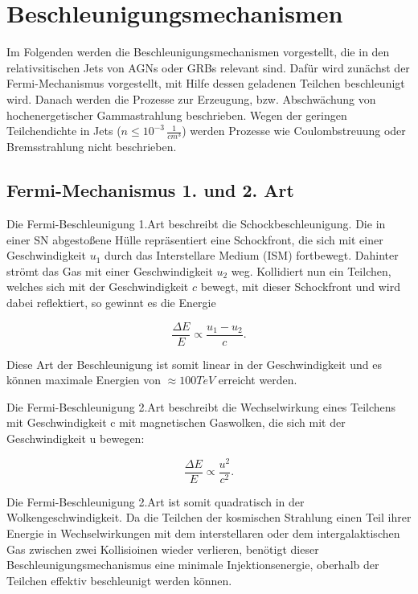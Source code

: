 \section{Beschleunigungsmechanismen} 
\label{sec:Beschleunigungsmechanismen}
Im Folgenden werden die Beschleunigungsmechanismen vorgestellt, die in den relativsitischen Jets von AGNs oder GRBs relevant sind.
Dafür wird zunächst der Fermi-Mechanismus vorgestellt, mit Hilfe dessen geladenen Teilchen beschleunigt wird.
Danach werden die Prozesse zur Erzeugung, bzw. Abschwächung von hochenergetischer Gammastrahlung beschrieben.
Wegen der geringen Teilchendichte in Jets ($n\leq 10^{-3}\,\frac{1}{cm^3}$) werden Prozesse wie Coulombstreuung oder Bremsstrahlung nicht beschrieben.

\subsection{Fermi-Mechanismus 1. und 2. Art}
Die Fermi-Beschleunigung 1.Art beschreibt die Schockbeschleunigung.
Die in einer SN abgestoßene Hülle repräsentiert eine Schockfront, die sich mit einer Geschwindigkeit $u_1$ durch das Interstellare Medium (ISM) fortbewegt. 
Dahinter strömt das Gas mit einer Geschwindigkeit $u_2$ weg.
Kollidiert nun ein Teilchen, welches sich mit der Geschwindigkeit $c$ bewegt, mit dieser Schockfront und wird dabei reflektiert, so gewinnt es die Energie

\begin{equation}
 \frac{\Delta E}{E}\propto \frac{u_1-u_2}{c}.
\end{equation}

Diese Art der Beschleunigung ist somit linear in der Geschwindigkeit und es können maximale Energien von $\approx 100\si{TeV}$ erreicht werden.\cite{Grupen}\cite{Longair}

Die Fermi-Beschleunigung 2.Art beschreibt die Wechselwirkung eines Teilchens mit Geschwindigkeit c mit magnetischen Gaswolken, die sich mit der Geschwindigkeit u bewegen:

\begin{equation}
 \frac{\Delta E}{E}\propto \frac{u^2}{c^2}.
\end{equation}

Die Fermi-Beschleunigung 2.Art ist somit quadratisch in der Wolkengeschwindigkeit.
Da die Teilchen der kosmischen Strahlung einen Teil ihrer Energie in Wechselwirkungen mit dem interstellaren oder dem intergalaktischen Gas zwischen zwei Kollisioinen wieder verlieren, benötigt dieser Beschleunigungsmechanismus eine minimale Injektionsenergie, oberhalb der Teilchen effektiv beschleunigt werden können.\cite{Grupen}\cite{Longair}


